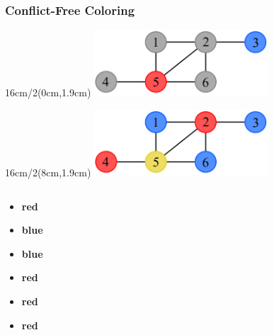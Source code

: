 \documentclass[xcolor=dvipsnames,aspectratio=1610]{beamer}
\newcommand{\exampleheight}{1.9cm}
\newcommand{\examplewidth}{16cm}
\begin{document}
  \begin{frame}
    \frametitle{Conflict-Free Coloring}

    \begin{textblock*}{\examplewidth/2}(0cm,\exampleheight) %
      \centering
      \includegraphics[width=6.5cm]{../figures/example-cfcp.pdf}
    \end{textblock*}

    \begin{textblock*}{\examplewidth/2}(8cm,\exampleheight) %
      \centering
      \includegraphics[width=6.5cm]{../figures/example-vcp.pdf}
    \end{textblock*}

    \vspace{3cm}

    \pause

    \begin{columns}
      \begin{column}{0.5\textwidth}
        \begin{multicols}{2}
          \begin{itemize}[leftmargin=1.4cm]
            \item[1:] \textbf{red}
            \pause
            \item[2:] \textbf{blue}
            \pause
            \item[3:] \textbf{blue}
            \pause
            \item[4:] \textbf{red}
            \pause
            \item[5:] \textbf{red}
            \pause
            \item[6:] \textbf{red}
          \end{itemize}
        \end{multicols}
      \end{column}

      \pause


\end{columns}
\end{frame}
\end{document}
